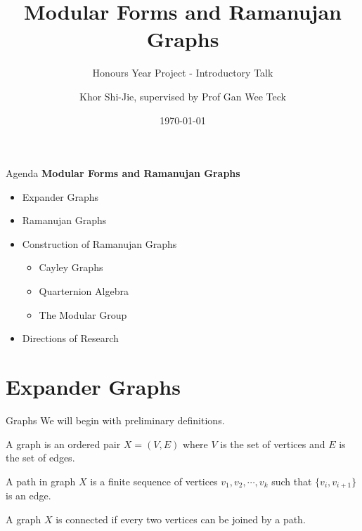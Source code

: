 \documentclass[10pt]{beamer}
\title{Modular Forms and Ramanujan Graphs}
\subtitle{Honours Year Project - Introductory Talk}
\date{\today}
\author{Khor Shi-Jie, supervised by Prof Gan Wee Teck}
\institute{National University of Singapore}
\theoremstyle{definition}\newtheorem{proposition}{Proposition}
\begin{document}
\maketitle

\begin{frame}{Agenda}
\textbf{Modular Forms and Ramanujan Graphs}
\begin{itemize}
	\item Expander Graphs
	\item Ramanujan Graphs
	\item Construction of Ramanujan Graphs
	\begin{itemize}
	    \item Cayley Graphs
		\item Quarternion Algebra
		\item The Modular Group			
	\end{itemize}
	\item Directions of Research
\end{itemize}
\end{frame}

\section{Expander Graphs}

\begin{frame}{Graphs}
We will begin with preliminary definitions. \pause

\begin{definition}[Graph]
A graph is an ordered pair $X = (V,E)$ where $V$ is the set of vertices and $E$ is the set of edges. 
\end{definition}\pause

\begin{definition}[Path]
A path in graph $X$ is a finite sequence of vertices $v_1, v_2, \cdots, v_k$ such that $\{v_i, v_{i+1}\}$ is an edge. 
\end{definition}\pause

\begin{definition}[Connectivity]
A graph $X$ is connected if every two vertices can be joined by a path.
\end{definition}
\end{frame}
\end{document}
